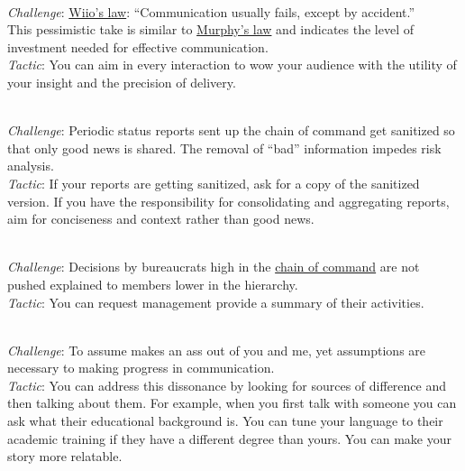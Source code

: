 \ \\
\textit{Challenge}: \href{https://en.wikipedia.org/wiki/Wiio\%27s_laws}{Wiio's law}: 
%
%
%
``Communication usually fails, except by accident.''\\
This pessimistic take is similar to \href{https://en.wikipedia.org/wiki/Murphy\%27s_law}{Murphy's law}
and indicates the level of investment needed for effective communication. \\
\textit{Tactic}: You can aim in every interaction to wow your audience with the utility of your insight and the precision of delivery.


\ \\
\textit{Challenge}: Periodic status reports sent up the chain of command get sanitized so that only good news is shared. The removal of ``bad'' information impedes risk analysis. \\
\textit{Tactic}: If your reports are getting sanitized, ask for a copy of the sanitized version. If you have the responsibility for consolidating and aggregating reports, aim for conciseness and context rather than good news. 

\ \\
\textit{Challenge}: Decisions by bureaucrats high in the \href{https://en.wikipedia.org/wiki/Command_hierarchy}{chain of command}
\iftoggle{WPinmargin}{\marginpar{$>$Wikipedia: Command hierarchy}}{}
are not pushed explained to members lower in the hierarchy. \\
\textit{Tactic}: You can request management provide a summary of their activities.

\ \\
\textit{Challenge}: To assume makes an ass out of you and me, 
%
%
yet assumptions are necessary to making progress in communication.\\ 
\textit{Tactic}: You can address this dissonance by looking for sources of difference and then talking about them. For example, when you first talk with someone you can ask what their educational background is. You can tune your language to their academic training if they have a different degree than yours. You can make your story more relatable. 

